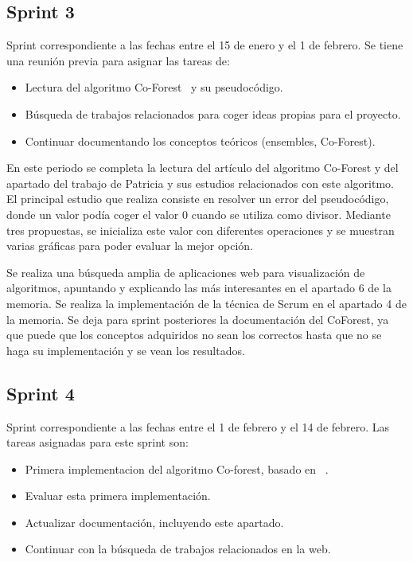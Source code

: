 \subsection{Sprint 3}
Sprint correspondiente a las fechas entre el 15 de enero y el 1 de febrero. Se tiene una reunión previa para asignar las tareas de: 
\begin{itemize}
	\item Lectura del algoritmo Co-Forest~\cite{IEEE:CoForest} y su pseudocódigo.
	\item Búsqueda de trabajos relacionados para coger ideas propias para el proyecto.
	\item Continuar documentando los conceptos teóricos (ensembles, Co-Forest).
\end{itemize}

En este periodo se completa la lectura del artículo del algoritmo Co-Forest y del apartado del trabajo de Patricia y sus estudios relacionados con este algoritmo. El principal estudio que realiza consiste en resolver un error del pseudocódigo, donde un valor podía coger el valor 0 cuando se utiliza como divisor. Mediante tres propuestas, se inicializa este valor con diferentes operaciones y se muestran varias gráficas para poder evaluar la mejor opción.  %

Se realiza una búsqueda amplia de aplicaciones web para visualización de algoritmos, apuntando y explicando las más interesantes en el apartado 6 de la memoria.
Se realiza la implementación de la técnica de Scrum en el apartado 4 de la memoria.
Se deja para sprint posteriores la documentación del CoForest, ya que puede que los conceptos adquiridos no sean los correctos hasta que no se haga su implementación y se vean los resultados.

\subsection{Sprint 4}
Sprint correspondiente a las fechas entre el 1 de febrero y el 14 de febrero. Las tareas asignadas para este sprint son:
\begin{itemize}
	\item Primera implementacion del algoritmo Co-forest, basado en ~\cite{IEEE:CoForest}.
	\item Evaluar esta primera implementación.
	\item Actualizar documentación, incluyendo este apartado.
	\item Continuar con la búsqueda de trabajos relacionados en la web.
\end{itemize}

